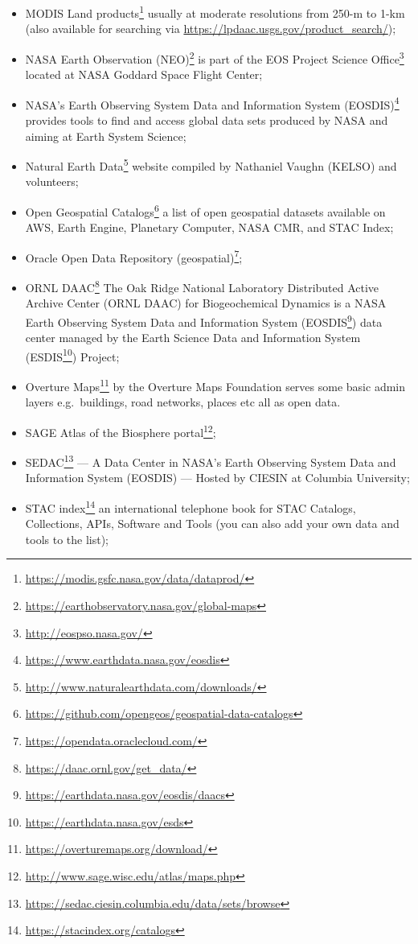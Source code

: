 \documentclass[
  graybox,natbib,nospthms]{svmono}
\renewcommand{\href}[2]{#2 (\url{#1})}
\renewcommand{\href}[2]{#2\footnote{\url{#1}}}
\begin{document}
\begin{itemize}
\item
  \href{https://modis.gsfc.nasa.gov/data/dataprod/}{MODIS Land products} usually at moderate resolutions from 250-m to 1-km (also available for searching via \url{https://lpdaac.usgs.gov/product_search/});
\item
  \href{https://earthobservatory.nasa.gov/global-maps}{NASA Earth Observation (NEO)} is part of the \href{http://eospso.nasa.gov/}{EOS Project Science Office} located at NASA Goddard Space Flight Center;
\item
  \href{https://www.earthdata.nasa.gov/eosdis}{NASA's Earth Observing System Data and Information System (EOSDIS)} provides tools to find and access global data sets produced by NASA and aiming at Earth System Science;
\item
  \href{http://www.naturalearthdata.com/downloads/}{Natural Earth Data} website compiled by Nathaniel Vaughn (KELSO) and volunteers;
\item
  \href{https://github.com/opengeos/geospatial-data-catalogs}{Open Geospatial Catalogs} a list of open geospatial datasets available on AWS, Earth Engine, Planetary Computer, NASA CMR, and STAC Index;
\item
  \href{https://opendata.oraclecloud.com/}{Oracle Open Data Repository (geospatial)};
\item
  \href{https://daac.ornl.gov/get_data/}{ORNL DAAC} The Oak Ridge National Laboratory Distributed Active Archive Center (ORNL DAAC) for Biogeochemical Dynamics is a NASA Earth Observing System Data and Information System (\href{https://earthdata.nasa.gov/eosdis/daacs}{EOSDIS}) data center managed by the Earth Science Data and Information System (\href{https://earthdata.nasa.gov/esds}{ESDIS}) Project;
\item
  \href{https://overturemaps.org/download/}{Overture Maps} by the Overture Maps Foundation serves some basic admin layers e.g.~buildings, road networks, places etc all as open data.
\item
  \href{http://www.sage.wisc.edu/atlas/maps.php}{SAGE Atlas of the Biosphere portal};
\item
  \href{https://sedac.ciesin.columbia.edu/data/sets/browse}{SEDAC} --- A Data Center in NASA's Earth Observing System Data and Information System (EOSDIS) --- Hosted by CIESIN at Columbia University;
\item
  \href{https://stacindex.org/catalogs}{STAC index} an international telephone book for STAC Catalogs, Collections, APIs, Software and Tools (you can also add your own data and tools to the list);

\end{itemize}
\end{document}
